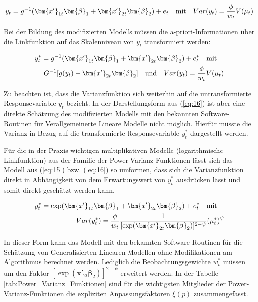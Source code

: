 \begin{eqnarray} \label{eq:15}
y_t=g^{-1}(\bm{x'}_{1t} \bm{\beta}_1  +   \bm{x'}_{2t} \bm{\beta}_2)   + e_t     \quad  \textnormal{mit}  \quad   Var(y_t) = \frac{\phi}{w_t}V(\mu_t)
\end{eqnarray}

Bei der Bildung des modifizierten Modells müssen die a-priori-Informationen über die Linkfunktion auf das Skalenniveau von $y_t$  transformiert werden:

\begin{eqnarray} \label{eq:16}
y^*_t=g^{-1}(\bm{x'}_{1t} \bm{\beta}_1  +   \bm{x'}_{2t} \bm{\beta}_2)   + e^*_t     \quad  \textnormal{mit}  \quad  \nonumber \\           G^{-1}[g(y_t) - \bm{x'}_{2t} \bm{\beta}_2] \quad  \textnormal{und}  \quad    Var(y_t) = \frac{\phi}{w_t}V(\mu_t)
\end{eqnarray}

Zu beachten ist, dass die Varianzfunktion sich weiterhin auf die untransformierte Responsevariable $y_t$  bezieht. In der Darstellungsform aus (\ref{eq:16}) ist aber eine direkte Schätzung des modifizierten Modells mit den bekannten Software-Routinen für Verallgemeinerte Lineare Modelle nicht möglich. Hierfür müsste die Varianz in Bezug auf die transformierte Responsevariable $y^*_t$  dargestellt werden. 

Für die in der Praxis wichtigen multiplikativen Modelle (logarithmische Linkfunktion) aus der Familie der Power-Varianz-Funktionen lässt sich das Modell aus (\ref{eq:15}) bzw. (\ref{eq:16}) so umformen, dass sich die Varianzfunktion direkt in Abhängigkeit von dem Erwartungswert von $y^*_t$  ausdrücken lässt und somit direkt geschätzt werden kann. 

\begin{eqnarray} 
y^*_t=\exp (\bm{x'}_{1t} \bm{\beta}_1  +   \bm{x'}_{2t} \bm{\beta}_2)   + e^*_t     \quad  \textnormal{mit}  \quad  \nonumber \\  
           Var(y^*_t) =   \frac{\phi}{w_t}   \frac{1}{[\exp(\bm{x'}_{2t} \bm{\beta}_2)]^{2-\psi}}     {(\mu^*_t)}^\psi
\end{eqnarray}


In dieser Form kann das Modell mit den bekannten Software-Routinen für die Schätzung von Generalisierten Linearen Modellen ohne Modifikationen am Algorithmus berechnet werden. Lediglich die Beobachtungsgewichte  $w^*_t$  müssen um den Faktor  $[\exp(\bm{x'}_{2t} \bm{\beta}_2)]^{2-\psi}$ erweitert werden. In der Tabelle \ref{tab:Power_Varianz_Funktionen} sind für die wichtigsten Mitglieder der Power-Varianz-Funktionen die expliziten Anpassungsfaktoren $\xi(p)$  zusammengefasst.


